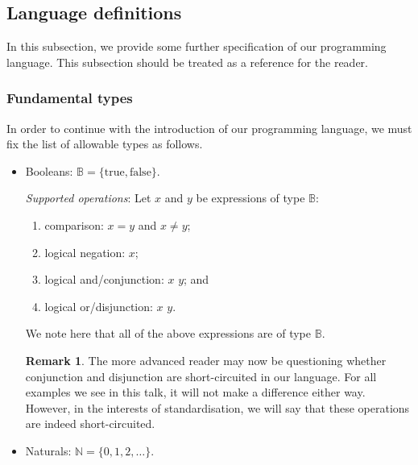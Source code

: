 \documentclass[11pt,a4paper,reqno]{amsart}
\theoremstyle{plain}
\theoremstyle{definition}
\theoremstyle{definition}
\newtheorem{remark}[theorem]{Remark}
\newcommand\hl[1]{\colorbox{gray!10}{#1}}
\begin{document}
\subsection{Language definitions}
In this subsection, we provide some further specification of our programming language.
This subsection should be treated as a reference for the reader.

\subsubsection{Fundamental types}\label{sec:fundamental-types}

In order to continue with the introduction of our programming language, we must fix the list of allowable types as follows.
\begin{itemize}[leftmargin=2em]
	\item Booleans: $\mathbb B = \{\mathrm{true}, \mathrm{false}\}$.

	      \smallskip
	      \noindent
	      \textit{Supported operations}:
	      Let $x$ and $y$ be expressions of type $\mathbb B$:
	      \begin{enumerate}
		      \item comparison: \hl{$x = y$} and \hl{$x \neq y$};
		      \item logical negation: \hl{{\Not $x$}};
		      \item logical and/conjunction: \hl{$x$ \And $y$}; and
		      \item logical or/disjunction: \hl{$x$ \Or $y$}.
	      \end{enumerate}
	      We note here that all of the above expressions are of type $\mathbb B$.

	      \medskip

	      \begin{remark}
		      The more advanced reader may now be questioning whether conjunction and disjunction are short-circuited in our language.
		      For all examples we see in this talk, it will not make a difference either way.
		      However, in the interests of standardisation, we will say that these operations are indeed short-circuited.
	      \end{remark}

	      \medskip

	\item Naturals: $\mathbb N = \{0,1,2,\ldots\}$.


\end{itemize}
\end{document}
